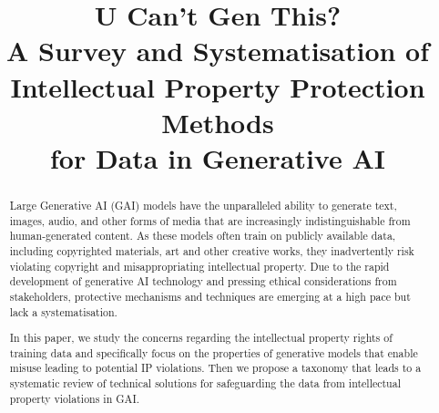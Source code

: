 \documentclass[conference,table]{IEEEtran} %
\title{U Can't Gen This?\\
A Survey and Systematisation of\\ Intellectual Property Protection Methods\\ for Data in Generative AI}
\author{
    \IEEEauthorblockN{Tanja Šarčević}
    \IEEEauthorblockA{\textit{SBA Research},
        Vienna, Austria\\
        tsarcevic@sba-research.org
    }
\and
    \IEEEauthorblockN{Alicja Karlowicz}
    \IEEEauthorblockA{\textit{SBA Research},
        Vienna, Austria\\
        akarlowicz@sba-research.org
    }
\and
    \IEEEauthorblockN{Rudolf Mayer}
    \IEEEauthorblockA{\textit{SBA Research},
        Vienna, Austria\\
        rmayer@sba-research.org
    }
\and
    \IEEEauthorblockN{Ricardo Baeza-Yates}
    \IEEEauthorblockA{\textit{EAI, Northeastern University},
        Boston, MA, USA\\
        rbaeza@acm.org
    }
\and
    \IEEEauthorblockN{Andreas Rauber}
    \IEEEauthorblockA{\textit{TU Wien},
        Vienna, Austria\\
        andreas.rauber@tuwien.ac.at
    }
}
\begin{document}
\maketitle
\thispagestyle{plain}
\pagestyle{plain}

\begin{abstract}
Large Generative AI (GAI) models have the unparalleled ability to generate text, images, audio, and other forms of media that are increasingly indistinguishable from human-generated content.
As these models often train on publicly available data, including copyrighted materials, art and other creative works, they inadvertently risk violating copyright and misappropriating intellectual property. Due to the rapid development of generative AI technology and pressing ethical considerations from stakeholders, protective mechanisms and techniques are emerging at a high pace but lack a systematisation.

In this paper, we study the concerns regarding the intellectual property rights of training data and specifically focus on the properties of generative models that enable misuse leading to potential IP violations. Then we propose a taxonomy that leads to a systematic review of technical solutions for safeguarding the data from intellectual property violations in GAI.

\end{abstract}
\end{document}
